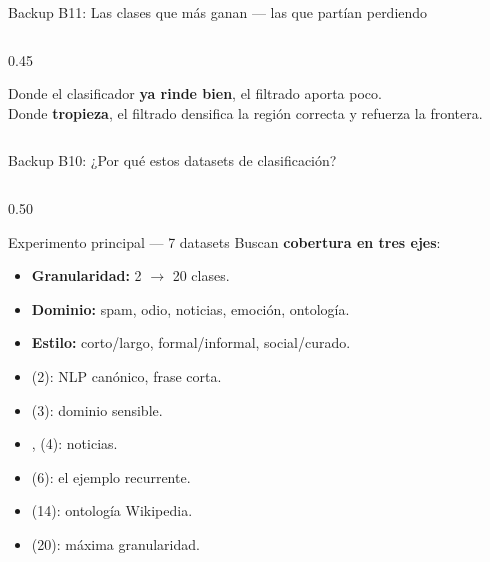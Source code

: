\begin{frame}{Backup B11: Las clases que más ganan --- las que partían perdiendo}
\begin{columns}[T]
\begin{column}{0.45\textwidth}
\vspace{0.4em}
\begin{insight}
\scriptsize
Donde el clasificador \textbf{ya rinde bien}, el filtrado aporta poco.\\
Donde \textbf{tropieza}, el filtrado densifica la región correcta y \alert{refuerza la frontera}.
\end{insight}
\end{column}

\end{columns}

\end{frame}

\begin{frame}{Backup B10: ¿Por qué estos datasets de clasificación?}
\begin{columns}[T]

\begin{column}{0.50\textwidth}
\begin{block}{\small Experimento principal --- 7 datasets}
\scriptsize
Buscan \textbf{cobertura en tres ejes}:
\begin{itemize}\setlength\itemsep{0pt}
  \item \textbf{Granularidad:} 2 $\to$ 20 clases.
  \item \textbf{Dominio:} spam, odio, noticias, emoción, ontología.
  \item \textbf{Estilo:} corto/largo, formal/informal, social/curado.
\end{itemize}
\vspace{0.4em}
\begin{itemize}\setlength\itemsep{0pt}
  \item {} (2): NLP canónico, frase corta.
  \item {} (3): dominio sensible.
  \item {},  (4): noticias.
  \item {} (6): el ejemplo recurrente.
  \item {} (14): ontología Wikipedia.
  \item {} (20): máxima granularidad.
\end{itemize}
\end{block}
\end{column}


\end{columns}
\end{frame}
